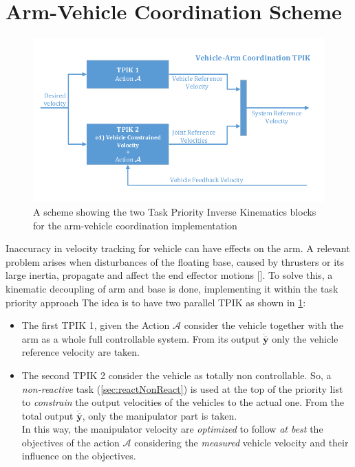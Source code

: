 \section{Arm-Vehicle Coordination Scheme}
\label{sec:armVehScheme}
\begin{figure}[H]
	\begin{center}
		\includegraphics[width=0.90\columnwidth]{vehArmCoordScheme}
		\caption[Arm-Vehicle Coordination Scheme in the TPIK]{A scheme showing the two Task Priority Inverse Kinematics blocks for the arm-vehicle coordination implementation}\label{fig:veharmcoord}
	\end{center}
\end{figure}
Inaccuracy in velocity tracking for vehicle can have effects on the arm. 
A relevant problem arises when disturbances of the floating base, caused by thrusters or its large inertia, propagate and affect the end effector motions [\cite{IntroMaris2}].
To solve this, a kinematic decoupling of arm and base is done, implementing it within the task priority approach The idea is to have two parallel TPIK as shown in \ref{fig:veharmcoord}:
\begin{itemize}
	\item The first TPIK 1, given the Action $\mathcal{A}$ consider the vehicle together with the arm as a whole full controllable system. From its output $\dot{\boldsymbol{\bar{y}}}$ only the vehicle reference velocity are taken.
	\item The second TPIK 2 consider the vehicle as totally non controllable. So, a \textit{non-reactive} task (\ref{sec:reactNonReact})  is used at the top of the priority list to \textit{constrain} the output velocities of the vehicles to the actual one. From the total output $\dot{\boldsymbol{\bar{y}}}$, only the manipulator part is taken.\\
	In this way, the manipulator velocity are \textit{optimized} to follow \textit{at best} the objectives of the action $\mathcal{A}$ considering the \textit{measured} vehicle velocity and their influence on the objectives.	
\end{itemize}

